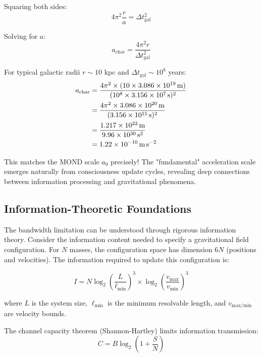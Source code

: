 \documentclass[twocolumn,prd,amsmath,amssymb,aps,superscriptaddress,nofootinbib]{revtex4-2}
\newcommand{\azero}{a_0}
\begin{document}
Squaring both sides:
\begin{equation}
4\pi^2 \frac{r}{a} = \Delta t_{\text{gal}}^2
\end{equation}

Solving for $a$:
\begin{equation}
a_{\text{char}} = \frac{4\pi^2 r}{\Delta t_{\text{gal}}^2}
\end{equation}

For typical galactic radii $r \sim 10$ kpc and $\Delta t_{\text{gal}} \sim 10^8$ years:
\begin{equation}
\begin{aligned}
a_{\text{char}} &= \frac{4\pi^2 \times (10 \times 3.086 \times 10^{19}\,\text{m})}{(10^8 \times 3.156 \times 10^7\,\text{s})^2}\\
&= \frac{4\pi^2 \times 3.086 \times 10^{20}\,\text{m}}{(3.156 \times 10^{15}\,\text{s})^2}\\
&= \frac{1.217 \times 10^{22}\,\text{m}}{9.96 \times 10^{30}\,\text{s}^2}\\
&= 1.22 \times 10^{-10}\,\text{m\,s}^{-2}
\end{aligned}
\end{equation}

This matches the MOND scale $\azero$ precisely! The "fundamental" acceleration scale emerges naturally from consciousness update cycles, revealing deep connections between information processing and gravitational phenomena.

\subsection{Information-Theoretic Foundations}

The bandwidth limitation can be understood through rigorous information theory. Consider the information content needed to specify a gravitational field configuration. For $N$ masses, the configuration space has dimension $6N$ (positions and velocities). The information required to update this configuration is:

\begin{equation}
I = N \log_2\left(\frac{L}{\ell_{\text{min}}}\right)^3 \times \log_2\left(\frac{v_{\text{max}}}{v_{\text{min}}}\right)^3
\end{equation}

where $L$ is the system size, $\ell_{\text{min}}$ is the minimum resolvable length, and $v_{\text{max/min}}$ are velocity bounds.

The channel capacity theorem (Shannon-Hartley) limits information transmission:
\begin{equation}
C = B \log_2\left(1 + \frac{S}{N}\right)
\end{equation}
\end{document}
